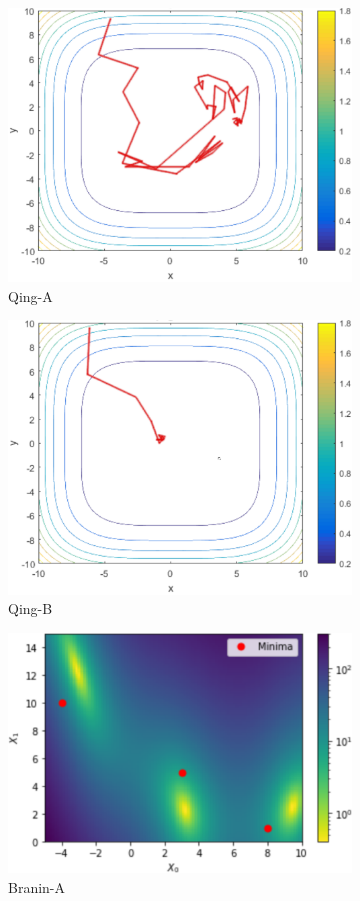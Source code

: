 \documentclass[conference]{IEEEtran}
\begin{document}
\begin{figure}[!t]
\begin{subfigure}{.275\textwidth}
  \centering
  \includegraphics[width=.6\linewidth]{qinga.png}
  \caption{Qing-A}
  \label{fig:figur:9}
\end{subfigure}%
\begin{subfigure}{.275\textwidth}
  \centering
  \includegraphics[width=.6\linewidth]{qingb.png}
  \caption{Qing-B}
  \label{fig:figur:10}
\end{subfigure}
\begin{subfigure}{.275\textwidth}
  \centering
  \includegraphics[width=.6\linewidth]{branina.png}
  \caption{Branin-A}
  \label{fig:figur:11}
\end{subfigure}%
\begin{subfigure}{.275\textwidth}
  \centering

\end{subfigure}
\end{figure}
\end{document}
